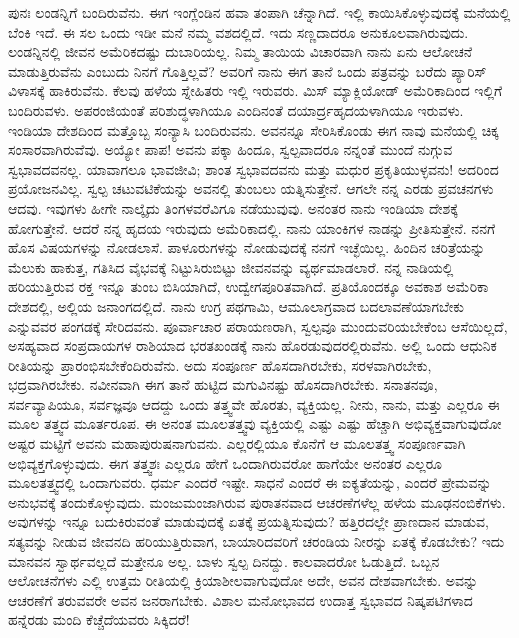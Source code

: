 ಪುನಃ ಲಂಡನ್ನಿಗೆ ಬಂದಿರುವೆನು. ಈಗ ಇಂಗ್ಲೆಂಡಿನ ಹವಾ ತಂಪಾಗಿ ಚೆನ್ನಾಗಿದೆ. ಇಲ್ಲಿ ಕಾಯಿಸಿಕೊಳ್ಳುವುದಕ್ಕೆ ಮನೆಯಲ್ಲಿ ಬೆಂಕಿ ಇದೆ. ಈ ಸಲ ಒಂದು ಇಡೀ ಮನೆ ನಮ್ಮ ವಶದಲ್ಲಿದೆ. ಇದು ಸಣ್ಣದಾದರೂ ಅನುಕೂಲವಾಗಿರುವುದು. ಲಂಡನ್ನಿನಲ್ಲಿ ಜೀವನ ಅಮೆರಿಕದಷ್ಟು ದುಬಾರಿಯಲ್ಲ. ನಿಮ್ಮ ತಾಯಿಯ ವಿಚಾರವಾಗಿ ನಾನು ಏನು ಆಲೋಚನೆ ಮಾಡುತ್ತಿರುವೆನು ಎಂಬುದು ನಿನಗೆ ಗೊತ್ತಿಲ್ಲವೆ? ಅವರಿಗೆ ನಾನು ಈಗ ತಾನೆ ಒಂದು ಪತ್ರವನ್ನು ಬರೆದು ಪ್ಯಾರಿಸ್‌ ವಿಳಾಸಕ್ಕೆ ಹಾಕಿರುವೆನು. ಕೆಲವು ಹಳೆಯ ಸ್ನೇಹಿತರು ಇಲ್ಲಿ ಇರುವರು. ಮಿಸ್ ಮ್ಯಾಕ್ಲಿಯೋಡ್ ಅಮೆರಿಕಾದಿಂದ ಇಲ್ಲಿಗೆ ಬಂದಿರುವಳು. ಅಪರಂಜಿಯಂತೆ ಪರಿಶುದ್ಧಳಾಗಿಯೂ ಎಂದಿನಂತೆ ದಯಾರ್ದ್ರಹೃದಯಳಾಗಿಯೂ ಇರುವಳು. ಇಂಡಿಯಾ ದೇಶದಿಂದ ಮತ್ತೊಬ್ಬ ಸಂನ್ಯಾಸಿ ಬಂದಿರುವನು. ಅವನನ್ನೂ ಸೇರಿಸಿಕೊಂಡು ಈಗ ನಾವು ಮನೆಯಲ್ಲಿ ಚಿಕ್ಕ ಸಂಸಾರವಾಗಿರುವೆವು. ಅಯ್ಯೋ ಪಾಪ! ಅವನು ಪಕ್ಕಾ ಹಿಂದೂ, ಸ್ವಲ್ಪವಾದರೂ ನನ್ನಂತೆ ಮುಂದೆ ನುಗ್ಗುವ ಸ್ವಭಾವದವನಲ್ಲ. ಯಾವಾಗಲೂ ಭಾವಜೀವಿ; ಶಾಂತ ಸ್ವಭಾವದವನು ಮತ್ತು ಮಧುರ ಪ್ರಕೃತಿಯುಳ್ಳವನು! ಅದರಿಂದ ಪ್ರಯೋಜನವಿಲ್ಲ. ಸ್ವಲ್ಪ ಚಟುವಟಿಕೆಯನ್ನು ಅವನಲ್ಲಿ ತುಂಬಲು ಯತ್ನಿಸುತ್ತೇನೆ. ಆಗಲೇ ನನ್ನ ಎರಡು ಪ್ರವಚನಗಳು ಆದವು. ಇವುಗಳು ಹೀಗೇ ನಾಲ್ಕೈದು ತಿಂಗಳವರೆವಿಗೂ ನಡೆಯುವುವು. ಅನಂತರ ನಾನು ಇಂಡಿಯಾ ದೇಶಕ್ಕೆ ಹೋಗುತ್ತೇನೆ. ಆದರೆ ನನ್ನ ಹೃದಯ ಇರುವುದು ಅಮೆರಿಕಾದಲ್ಲಿ. ನಾನು ಯಾಂಕಿಗಳ ನಾಡನ್ನು ಪ್ರೀತಿಸುತ್ತೇನೆ. ನನಗೆ ಹೊಸ ವಿಷಯಗಳನ್ನು ನೋಡಲಾಸೆ. ಪಾಳೂರುಗಳನ್ನು ನೋಡುವುದಕ್ಕೆ ನನಗೆ ಇಚ್ಛೆಯಿಲ್ಲ. ಹಿಂದಿನ ಚರಿತ್ರೆಯನ್ನು ಮೆಲುಕು ಹಾಕುತ್ತ, ಗತಿಸಿದ ವೈಭವಕ್ಕೆ ನಿಟ್ಟುಸಿರುಬಿಟ್ಟು ಜೀವನವನ್ನು ವ್ಯರ್ಥಮಾಡಲಾರೆ. ನನ್ನ ನಾಡಿಯಲ್ಲಿ ಹರಿಯುತ್ತಿರುವ ರಕ್ತ ಇನ್ನೂ ತುಂಬ ಬಿಸಿಯಾಗಿದೆ, ಉದ್ವೇಗಪೂರಿತವಾಗಿದೆ. ಪ್ರತಿಯೊಂದಕ್ಕೂ ಅವಕಾಶ ಅಮೆರಿಕಾ ದೇಶದಲ್ಲಿ, ಅಲ್ಲಿಯ ಜನಾಂಗದಲ್ಲಿದೆ. ನಾನು ಉಗ್ರ ಪಥಗಾಮಿ, ಆಮೂಲಾಗ್ರವಾದ ಬದಲಾವಣೆಯಾಗಬೇಕು ಎನ್ನುವವರ ಪಂಗಡಕ್ಕೆ ಸೇರಿದವನು. ಪೂರ್ವಾಚಾರ ಪರಾಯಣರಾಗಿ, ಸ್ವಲ್ಪವೂ ಮುಂದುವರಿಯಬೇಕೆಂಬ ಆಸೆಯಿಲ್ಲದೆ, ಅಸಹ್ಯವಾದ ಸಂಪ್ರದಾಯಗಳ ರಾಶಿಯಾದ ಭರತಖಂಡಕ್ಕೆ ನಾನು ಹೊರಡುವುದರಲ್ಲಿರುವೆನು. ಅಲ್ಲಿ ಒಂದು ಆಧುನಿಕ ರೀತಿಯನ್ನು ಪ್ರಾರಂಭಿಸಬೇಕೆಂದಿರುವೆನು. ಅದು ಸಂಪೂರ್ಣ ಹೊಸದಾಗಿರಬೇಕು, ಸರಳವಾಗಿರಬೇಕು, ಭದ್ರವಾಗಿರಬೇಕು. ನವೀನವಾಗಿ ಈಗ ತಾನೆ ಹುಟ್ಟಿದ ಮಗುವಿನಷ್ಟು ಹೊಸದಾಗಿರಬೇಕು. ಸನಾತನವೂ, ಸರ್ವವ್ಯಾಪಿಯೂ, ಸರ್ವಜ್ಞವೂ ಆದದ್ದು ಒಂದು ತತ್ತ್ವವೇ ಹೊರತು, ವ್ಯಕ್ತಿಯಲ್ಲ. ನೀನು, ನಾನು, ಮತ್ತು ಎಲ್ಲರೂ ಈ ಮೂಲ ತತ್ತ್ವದ ಮೂರ್ತರೂಪ. ಈ ಅನಂತ ಮೂಲತತ್ತ್ವವು ವ್ಯಕ್ತಿಯಲ್ಲಿ ಎಷ್ಟು ಎಷ್ಟು ಹೆಚ್ಚಾಗಿ ಅಭಿವ್ಯಕ್ತವಾಗುವುದೋ ಅಷ್ಟರ ಮಟ್ಟಿಗೆ ಅವನು ಮಹಾಪುರುಷನಾಗುವನು. ಎಲ್ಲರಲ್ಲಿಯೂ ಕೊನೆಗೆ ಆ ಮೂಲತತ್ತ್ವ ಸಂಪೂರ್ಣವಾಗಿ ಅಭಿವ್ಯಕ್ತಗೊಳ್ಳುವುದು. ಈಗ ತತ್ತ್ವಶಃ ಎಲ್ಲರೂ ಹೇಗೆ ಒಂದಾಗಿರುವರೋ ಹಾಗೆಯೇ ಅನಂತರ ಎಲ್ಲರೂ ಮೂಲತತ್ತ್ವದಲ್ಲಿ ಒಂದಾಗುವರು. ಧರ್ಮ ಎಂದರೆ ಇಷ್ಟೇ. ಸಾಧನೆ ಎಂದರೆ ಈ ಐಕ್ಯತೆಯನ್ನು, ಎಂದರೆ ಪ್ರೇಮವನ್ನು ಅನುಭವಕ್ಕೆ ತಂದುಕೊಳ್ಳುವುದು. ಮಂಜುಮಂಜಾಗಿರುವ ಪುರಾತನವಾದ ಆಚರಣೆಗಳೆಲ್ಲ ಹಳೆಯ ಮೂಢನಂಬಿಕೆಗಳು. ಅವುಗಳನ್ನು ಇನ್ನೂ ಬದುಕಿರುವಂತೆ ಮಾಡುವುದಕ್ಕೆ ಏತಕ್ಕೆ ಪ್ರಯತ್ನಿಸುವುದು? ಹತ್ತಿರದಲ್ಲೇ ಪ್ರಾಣದಾನ ಮಾಡುವ, ಸತ್ಯವನ್ನು ನೀಡುವ ಜೀವನದಿ ಹರಿಯುತ್ತಿರುವಾಗ, ಬಾಯಾರಿದವರಿಗೆ ಚರಂಡಿಯ ನೀರನ್ನು ಏತಕ್ಕೆ ಕೊಡಬೇಕು? ಇದು ಮಾನವನ ಸ್ವಾರ್ಥವಲ್ಲದೆ ಮತ್ತೇನೂ ಅಲ್ಲ. ಬಾಳು ಸ್ವಲ್ಪ ದಿನದ್ದು. ಕಾಲವಾದರೋ ಓಡುತ್ತಿದೆ. ಒಬ್ಬನ ಆಲೋಚನೆಗಳು ಎಲ್ಲಿ ಉತ್ತಮ ರೀತಿಯಲ್ಲಿ ಕ್ರಿಯಾಶೀಲವಾಗುವುದೋ ಅದೇ, ಅವನ ದೇಶವಾಗಬೇಕು. ಅವನ್ನು ಆಚರಣೆಗೆ ತರುವವರೇ ಅವನ ಜನರಾಗಬೇಕು. ವಿಶಾಲ ಮನೋಭಾವದ ಉದಾತ್ತ ಸ್ವಭಾವದ ನಿಷ್ಕಪಟಿಗಳಾದ ಹನ್ನೆರಡು ಮಂದಿ ಕೆಚ್ಚೆದೆಯವರು ಸಿಕ್ಕಿದರೆ!

